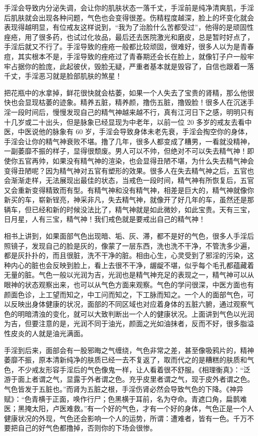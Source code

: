 手淫会导致内分泌失调，会让你的肌肤状态一落千丈，手淫前是纯净清爽肌，手淫后肌肤就会出现各种问题，气色也会变得很差。伤精程度越深，脸上的坏变化就会表现得越明显，有位戒友这样说到，“我为了治脸什么苦都受过”，他得的是顽固性痤疮，用了很多药，也试过化妆品，最后还去医院激光和磨皮，总是暂时好点了，手淫后就又不行了。手淫导致的痤疮一般都比较顽固，很难好，很多人以为是青春痘，其实根本不是，手淫导致的痤疮过了青春期还会长在脸上，就像钉子户一般牢牢占据你的脸庞，此起彼伏，毁脸无疑，严重者基本就是毁容了，自信也跟着一落千丈，手淫恶习就是脸部肌肤的煞星！

把花瓶中的水拿掉，鲜花很快就会枯萎，如果一个人失去了宝贵的肾精，那么他很快也会显现枯萎的迹象。精养五脏，精养颜，撸伤五脏，撸毁脸！很多人在沉迷手淫一段时间后，慢慢发现自己的精气神越来越不行，真有江河日下之感，明明只有十几岁或二十出头，但是脉象已经显现为中老年，以前一位 20 多岁的戒友去看中医，中医说他的脉象有 60 岁，手淫会导致身体未老先衰，手淫会掏空你的身体，手淫会让你的精气神衰败不堪。撸了几年，很多人都变成了糟男，一看就没精神，一副萎靡不振的样子，显得很颓废。男人可以不帅，但绝对不可以失去精气神！即使你五官再帅，如果没有精气神的渲染，也会显得丑陋不堪，为什么失去精气神会变得丑陋呢？因为精气神对五官有塑形的效果。很多人在失去精气神之后，五官也会渐渐走样，无法展现出最佳的状态，当戒色一段时间，精气神有所恢复后，五官又会重新变得精致而有型。有精气神和没有精气神，相差是巨大的，精气神就像你新买的车，崭新锃亮，神采非凡，失去精气神，就像开了好几年的车，虽然还是那辆车，但已经和新的时候没法比了，精气神就是如此微妙，如此宝贵。天有三宝，日月星，人有三宝，精气神！我们戒色就是要戒出自己的精气神！

相书上讲到，如果面部气色出现暗、垢、灰、滞，都不是好的气色，很多人手淫后照镜子，发现自己的脸是灰的，像蒙了一层东西，洗也洗不干净，不管洗多少遍，都是灰扑扑的，而且很脏，洗不干净的脏。相由心生，心灵受到了邪淫的污染，这种内心的脏也会反映到脸上，看上去很不干净，龌龊不堪，似乎每个毛孔都蕴藏着无量的脏。气色一般以光润为吉，光润也是精气神充足的表现之一，精气神可以从眼神的状态观察出来，也可以从气色方面来观察。气色的学问很深，中医方面也有颜面色诊，上工望而知之，中工问而知之，下工脉而知之。一个人的面部气色，可以反映出身体健康的状况，面部的不同区域也对应着身体的五脏六腑，通过观察气色的明暗清浊的变化，就可以大致判断出一个人的健康状况。上面讲到气色以光润为吉，但要注意的是，光润不同于油光，颜面之光如油抹者，反而不好，很多脂溢性皮炎的人就是油光满面。

手淫到后来，面部会有一股邪晦之气缠绕，气色非常之差，甚至像吸鸦片的，精神萎靡不振，原本清新纯净的肤质已经一去不复返了，取而代之的是糟糕的肤质和气色，不少戒友形容手淫后的气色像鬼一样，让人看着很不舒服。《相理衡真》：“泛游于面上者谓之气，显露于外者谓之色。充乎皮里者谓之气，现于皮外者谓之色。气色皆发于五脏也。”而肾为五脏之根，手淫伤肾必然会导致气色的下降。《神异赋》：“色青横于正面，唤作行尸；色黑横于耳前，名为夺命。青遮口角，扁鹊难医；黑掩太阳，卢医难救。”有一个好的气色，才有一个好的身体，气色正是一个人健康状况的外现，气色还会影响一个人的运势，所谓：遭难者，皆有一色。千万不要把自己的好气色都撸掉，否则你的下场会很惨。


